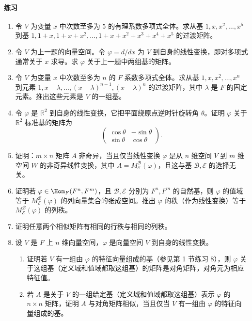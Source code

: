 \paragraph{练习}
\begin{enumerate}[label=\arabic*.]
\item 令 $V$ 为变量 $x$ 中次数至多为 $5$ 的有理系数多项式全体。求从基 $1,x,x^2,\ldots,x^5$ 到基 $1,1+x,1+x+x^2,\ldots,1+x+x^2+x^3+x^4+x^5$ 的过渡矩阵。
\item 令 $V$ 为上一题的向量空间。令 $\varphi=d/dx$ 为 $V$ 到自身的线性变换，即对多项式通常关于 $x$ 求导。求 $\varphi$ 关于上一题中两组基的矩阵。
\item 令 $V$ 为变量 $x$ 中次数至多为 $n$ 的 $F$ 系数多项式全体。求从基 $1,x,x^2,\ldots,x^n$ 到元素 $1,x-\lambda,\ldots,(x-\lambda)^{n-1},(x-\lambda)^n$ 的过渡矩阵，其中 $\lambda$ 是 $F$ 的固定元素。推出这些元素是 $V$ 的一组基。
\item 令 $\varphi$ 是 $\mathbb R^2$ 到自身的线性变换，它把平面绕原点逆时针旋转角 $\theta$。证明 $\varphi$ 关于 $\mathbb R^2$ 标准基的矩阵为
\[
\begin{pmatrix}\cos\theta&-\sin\theta\\ \sin\theta&\cos\theta\end{pmatrix}.
\]
\item 证明：$m\times n$ 矩阵 $A$ 非奇异，当且仅当线性变换 $\varphi$ 是从 $n$ 维空间 $V$ 到 $m$ 维空间 $W$ 的非奇异线性变换，其中 $A=M_{\mathcal E}^{\mathcal B}(\varphi)$，且这与基 $\mathcal B,\mathcal E$ 的选择无关。
\item 证明若 $\varphi\in\Hom_F(F^n,F^m)$，且 $\mathcal B,\mathcal E$ 分别为 $F^n,F^m$ 的自然基，则 $\varphi$ 的值域等于 $M_{\mathcal E}^{\mathcal B}(\varphi)$ 的列向量集合的张成空间。推出 $\varphi$ 的秩（作为线性变换）等于 $M_{\mathcal E}^{\mathcal B}(\varphi)$ 的列秩。
\item 证明任意两个相似矩阵有相同的行秩与相同的列秩。
\item 设 $V$ 是 $F$ 上 $n$ 维向量空间，$\varphi$ 是向量空间 $V$ 到自身的线性变换。
\begin{enumerate}[label=(\alph*)]
\item 证明若 $V$ 有一组由 $\varphi$ 的特征向量组成的基（参见第 1 节练习 8），则 $\varphi$ 关于这组基（定义域和值域都取这组基）的矩阵是对角矩阵，对角元为相应特征值。
\item 若 $A$ 是关于 $V$ 的一组给定基（定义域和值域都取这组基）表示 $\varphi$ 的 $n\times n$ 矩阵，证明 $A$ 与对角矩阵相似，当且仅当 $V$ 有一组由 $\varphi$ 的特征向量组成的基。
\end{enumerate}

\end{enumerate}
